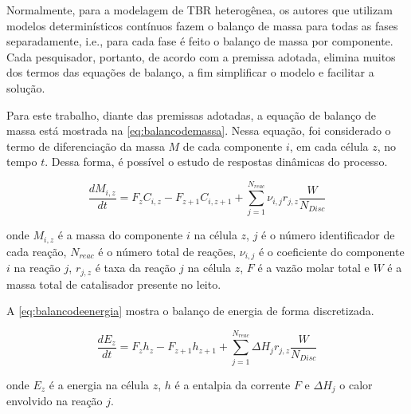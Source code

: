 Normalmente, para a modelagem de TBR heterogênea, os autores que utilizam
modelos determinísticos contínuos fazem o balanço de massa para todas as
fases separadamente, i.e., para cada fase é feito o balanço de massa por
componente. %
Cada pesquisador, portanto, de acordo com a premissa adotada, elimina muitos dos
termos das equações de balanço, a fim simplificar o modelo e facilitar a
solução. 

Para este trabalho, diante das premissas adotadas, a equação de balanço de massa
está mostrada na \autoref{eq:balancodemassa}. Nessa equação, foi considerado o
termo de diferenciação da massa $M$ de cada componente $i$, em cada célula $z$,
no tempo $t$. Dessa forma, é possível o estudo de respostas dinâmicas do
processo.

\begin{equation}
\dfrac{dM_{i,z}}{dt} = F_zC_{i,z} - F_{z+1}C_{i,z+1} +
\displaystyle\sum_{j=1}^{N_{reac}} \nu_{i,j}r_{j,z} \dfrac{W}{N_{Disc}}
\label{eq:balancodemassa}
\end{equation}

onde $M_{i,z}$ é a massa do componente $i$ na célula $z$, $j$ é o número
identificador de cada reação, $N_{reac}$ é o número total de reações,
$\nu_{i,j}$ é o coeficiente do componente $i$ na reação $j$, $r_{j,z}$ é taxa
da reação $j$ na célula $z$, $F$ é a vazão molar total e $W$ é a massa total de
catalisador presente no leito.


A \autoref{eq:balancodeenergia} mostra o balanço de energia de forma
discretizada.

\begin{equation}
\dfrac{dE_{z}}{dt} = F_zh_{z} - F_{z+1}h_{z+1} +
\displaystyle\sum_{j=1}^{N_{reac}} \Delta H_{j}r_{j,z} \dfrac{W}{N_{Disc}}
\label{eq:balancodeenergia}
\end{equation}

onde $E_{z}$ é a energia na célula $z$,  $h$ é a entalpia da
corrente $F$ e $\Delta H_{j}$ o calor envolvido na reação $j$.

